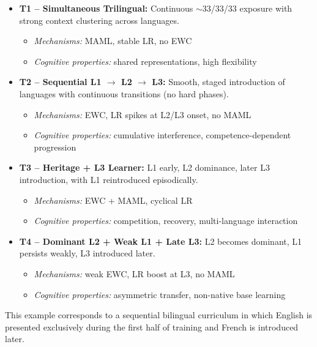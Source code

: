 \begin{itemize}
    \item \textbf{T1 – Simultaneous Trilingual:} Continuous $\sim$33/33/33 exposure with strong context clustering across languages.
    \begin{itemize}
        \item \textit{Mechanisms:} MAML, stable LR, no EWC
        \item \textit{Cognitive properties:} shared representations, high flexibility
    \end{itemize}

    \item \textbf{T2 – Sequential L1 $\rightarrow$ L2 $\rightarrow$ L3:} Smooth, staged introduction of languages with continuous transitions (no hard phases).
    \begin{itemize}
        \item \textit{Mechanisms:} EWC, LR spikes at L2/L3 onset, no MAML
        \item \textit{Cognitive properties:} cumulative interference, competence-dependent progression
    \end{itemize}

    \item \textbf{T3 – Heritage + L3 Learner:} L1 early, L2 dominance, later L3 introduction, with L1 reintroduced episodically.
    \begin{itemize}
        \item \textit{Mechanisms:} EWC + MAML, cyclical LR
        \item \textit{Cognitive properties:} competition, recovery, multi-language interaction
    \end{itemize}

    \item \textbf{T4 – Dominant L2 + Weak L1 + Late L3:} L2 becomes dominant, L1 persists weakly, L3 introduced later.
    \begin{itemize}
        \item \textit{Mechanisms:} weak EWC, LR boost at L3, no MAML
        \item \textit{Cognitive properties:} asymmetric transfer, non-native base learning
    \end{itemize}

\end{itemize} 


This example corresponds to a sequential bilingual curriculum in which English is presented exclusively during the first half of training and French is introduced later. 

